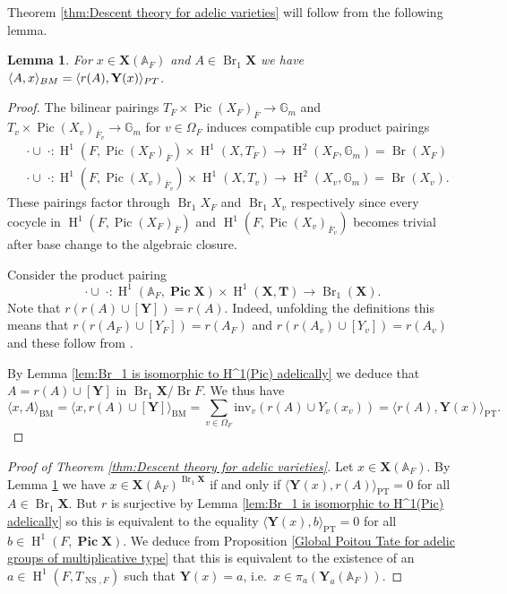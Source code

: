 \documentclass[a4paper,11pt,reqno]{amsart}
\newcommand{\G}{\mathbb{G}}
\newcommand{\A}{\mathbb{A}}
\DeclareMathOperator{\Pic}{Pic}
\DeclareMathOperator{\NS}{NS}
\DeclareMathOperator{\Br}{Br}
\DeclareMathOperator{\HH}{H}
\newtheorem{lemma}[theorem]{Lemma}
\theoremstyle{definition}
\begin{document}
Theorem \ref{thm:Descent theory for adelic varieties} will follow from the following lemma.
\begin{lemma}\label{lem:Brauer-Manin pairing agrees with Poitou-Tate pairing}
	For $x \in \mathbf{X}(\A_F)$ and $A \in \Br_1 \mathbf{X}$ we have $\langle A, x\rangle_{\emph{BM}} = \langle r(A),  \mathbf{Y}(x) \rangle_{\emph{PT}}$.
\end{lemma}
\begin{proof}
	The bilinear pairings $T_F \times \Pic (X_F)_{\overline{F}} \to \G_m$ and $T_v \times \Pic (X_v)_{\overline{F}_v} \to \G_m$ for $v \in \Omega_F$ induces compatible cup product pairings 
	\begin{align*}
		&\cdot \cup \; \cdot : \HH^1(F, \Pic (X_F)_{\overline{F}}) \times \HH^1(X, T_F) \to \HH^2(X_F, \G_m) = \Br(X_F)
		\\ & \cdot \cup \; \cdot :\HH^1(F, \Pic (X_v)_{\overline{F}_v}) \times \HH^1(X, T_v) \to \HH^2(X_v, \G_m) = \Br(X_v).
	\end{align*}
	These pairings factor through $\Br_1 X_F$ and $\Br_1 X_v$ respectively since every cocycle in $\HH^1(F, \Pic (X_F)_{\overline{F}})$ and $\HH^1(F, \Pic (X_v)_{\overline{F}_v})$ becomes trivial after base change to the algebraic closure.
	
	Consider the product pairing 
	\begin{equation*}
		\cdot \cup \; \cdot : \HH^1(\A_F, \bm{\Pic} \mathbf{X}) \times \HH^1(\mathbf{X}, \mathbf{T}) \to \Br_1(\mathbf{X}).
	\end{equation*}
	Note that $r(r(A) \cup [\mathbf{Y}]) = r(A)$. Indeed, unfolding the definitions this means that $r(r(A_F) \cup [Y_F]) = r(A_F)$ and $r(r(A_v) \cup [Y_v]) = r(A_v)$ and these follow from \cite[Thm. 4.1.1]{Skorogobatov2001Torsors}.
	
	By Lemma \ref{lem:Br_1 is isomorphic to H^1(Pic) adelically} we deduce that $A = r(A) \cup [\mathbf{Y}]$ in $\Br_1 \mathbf{X}/\Br F$. We thus have 
	\begin{equation*}
		\langle x, A \rangle_{\text{BM}} = \langle x, r(A) \cup [\mathbf{Y}] \rangle_{\text{BM}} = \sum_{v \in \Omega_F} \text{inv}_v(r(A) \cup Y_v(x_v)) = \langle r(A), \mathbf{Y}(x) \rangle_{\text{PT}}.
	\end{equation*} 
\end{proof}
\begin{proof}[Proof of Theorem \ref{thm:Descent theory for adelic varieties}]
	Let $x \in \mathbf{X}(\A_F)$. By Lemma \ref{lem:Brauer-Manin pairing agrees with Poitou-Tate pairing} we have $x \in \mathbf{X}(\A_F)^{\Br_1 \mathbf{X}}$ if and only if $\langle\mathbf{Y}(x), r(A) \rangle_{\text{PT}} = 0$ for all $A \in \Br_1 \mathbf{X}$. But $r$ is surjective by Lemma \ref{lem:Br_1 is isomorphic to H^1(Pic) adelically} so this is equivalent to the equality $\langle \mathbf{Y}(x), b \rangle_{\text{PT}} = 0$ for all $b \in \HH^1(F, \bm{\Pic} \mathbf{X})$. We deduce from Proposition \ref{Global Poitou Tate for adelic groups of multiplicative type} that this is equivalent to the existence of an $a \in \HH^1(F, T_{\NS, F})$ such that $\mathbf{Y}(x) = a$, i.e.~$x \in \pi_a(\mathbf{Y}_a(\A_F))$.
\end{proof}
\end{document}
